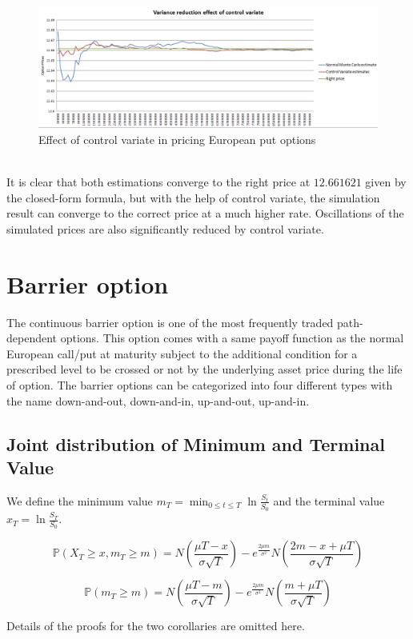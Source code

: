 \begin{figure}[h]
      \centering
	\includegraphics[scale=0.45]{controlVariateEuropeanPutDiagram.png}
      \caption{Effect of control variate in pricing European put options}
\end{figure}
\\
It is clear that both estimations converge to the right price at $12.661621$ given by the closed-form formula, but with the help of control variate, the simulation result can converge to the correct price at a much higher rate. Oscillations of the simulated prices are also significantly reduced by control variate.
\newpage

\section{Barrier option}
The continuous barrier option is one of the most frequently traded path-dependent options. This option comes with a same payoff function as the normal European call/put at maturity subject to the additional condition for a prescribed level to be crossed or not by the underlying asset price during the life of option. The barrier options can be categorized into four different types with the name down-and-out, down-and-in, up-and-out, up-and-in.
\subsection{Joint distribution of Minimum and Terminal Value}
We define the minimum value $\displaystyle m_{T} = \min_{0 \le t \le T} \ln{\frac{S_{t}}{S_{0}}}$ and the terminal value $x_{T} = \ln{\frac{S_{T}}{S_{0}}}$.\\
\begin{corollary}
$$\mathbb{P}(X_{T} \ge x, m_{T} \ge m) = N(\frac{\mu T - x}{\sigma \sqrt{T}}) - e^{\frac{2\mu m}{\sigma^{2}}}N(\frac{2m-x+\mu T}{\sigma \sqrt{T}})$$
\end{corollary}
\begin{corollary}
$$\mathbb{P}(m_{T} \ge m) = N(\frac{\mu T - m}{\sigma \sqrt{T}}) - e^{\frac{2\mu m}{\sigma^{2}}}N(\frac{m+\mu T}{\sigma \sqrt{T}})$$
\end{corollary}
Details of the proofs for the two corollaries are omitted here.
\newpage

